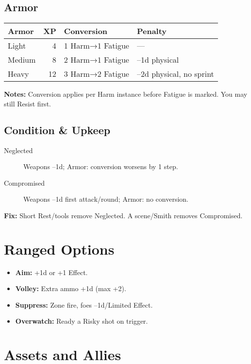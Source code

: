 \documentclass[11pt,twoside,openany]{book}
\begin{document}
\subsection*{Armor}

\begin{center}
\begin{tabular}{|l|r|l|l|}
\hline
\textbf{Armor} & \textbf{XP} & \textbf{Conversion} & \textbf{Penalty} \\
\hline
Light & 4 & 1 Harm→1 Fatigue & — \\
Medium & 8 & 2 Harm→1 Fatigue & –1d physical \\
Heavy & 12 & 3 Harm→2 Fatigue & –2d physical, no sprint \\
\hline
\end{tabular}
\end{center}

\textbf{Notes:} Conversion applies per Harm instance before Fatigue is marked. You may still Resist first.

\subsection*{Condition \& Upkeep}

\begin{description}
\item[Neglected] Weapons –1d; Armor: conversion worsens by 1 step.
\item[Compromised] Weapons –1d first attack/round; Armor: no conversion.
\end{description}

\textbf{Fix:} Short Rest/tools remove Neglected. A scene/Smith removes Compromised.

\section*{Ranged Options} 

\begin{itemize}
\item \textbf{Aim:} +1d or +1 Effect.
\item \textbf{Volley:} Extra ammo +1d (max +2).
\item \textbf{Suppress:} Zone fire, foes –1d/Limited Effect.
\item \textbf{Overwatch:} Ready a Risky shot on trigger.
\end{itemize}

\section*{Assets and Allies} 
\end{document}
